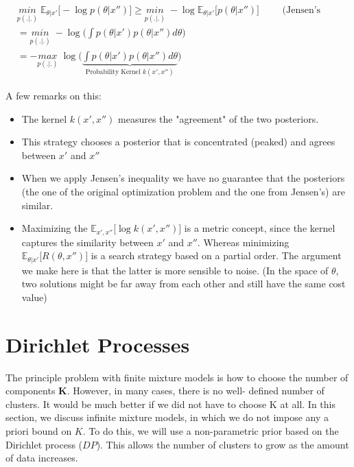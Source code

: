 \documentclass[twoside]{article}
\begin{document}
\begin{equation*}
\begin{aligned}
   & \underset{p(.|.)}{min} \; \mathbb{E}_{\theta|x'} \Big[ - \log{p(\theta|x'')}\Big] \geq \underset{p(.|.)}{min} \; - \log{\mathbb{E}_{\theta|x'} \Big[ {p(\theta|x'')}}\Big] &&& \text{(Jensen's inequality)}
   \\
   & = \underset{p(.|.)}{min} \; - \log{ \Big( \int{p(\theta|x') p(\theta|x'') d\theta} \Big)} \\
   & = - \underset{p(.|.)}{max} \;  \log{ \Big( \underbrace{\int{p(\theta|x') p(\theta|x'') d\theta}}_{\text{Probability Kernel $k(x',x'')$}} \Big)}
 \end{aligned}
\end{equation*}
\newpage 

A few remarks on this:
\begin{itemize}
    \item The kernel $k(x',x'')$  measures the "agreement" of the two posteriors.
    \item This strategy chooses a posterior that is concentrated (peaked) and agrees between $x'$ and $x''$
    \item When we apply Jensen's inequality we have no guarantee that the posteriors (the one of the original optimization problem and the one from Jensen's) are similar.
    \item Maximizing the $\mathbb{E}_{x',x''} \Big[ \log{k(x',x'')} \Big ]$ is a metric concept, since the kernel captures the similarity between $x'$ and $x''$. Whereas minimizing $\mathbb{E}_{\theta | x'} \Big [R(\theta,x'')\Big]$ is a search strategy based on a partial order. The argument we make here is that the latter is more sensible to noise. (In the space of $\theta$, two solutions might be far away from each other and still have the same cost value)
\end{itemize}


\section{Dirichlet Processes}
The principle problem with finite mixture models is how to choose the number of components $\mathbf{K}$. However, in many cases, there is no well- defined number of clusters. It would be much better if we did not have to choose K at all.
In this section, we discuss infinite mixture models, in which we do not impose any a priori bound on $K$. To do this, we will use a non-parametric prior based on the Dirichlet process ($DP$). This allows the number of clusters to grow as the amount of data increases.
\end{document}
